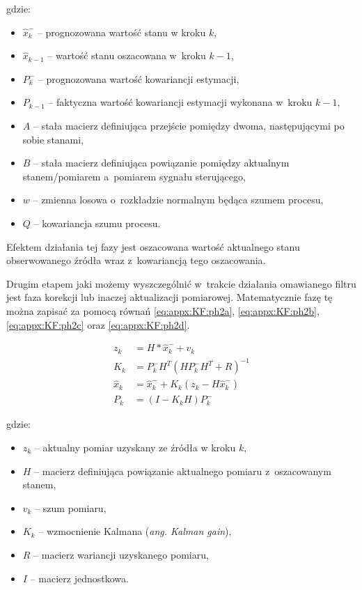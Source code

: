 gdzie:
\begin{itemize}
	\item $\widehat{x}^-_k$ -- prognozowana wartość stanu w kroku $k$,
	\item $\widehat{x}_{k-1}$ -- wartość stanu oszacowana w~kroku $k-1$,
	\item $P^-_k$ -- prognozowana wartość kowariancji estymacji,
	\item $P_{k-1}$ -- faktyczna wartość kowariancji estymacji wykonana w~kroku $k-1$,
	\item $A$ -- stała macierz definiująca przejście pomiędzy dwoma, następującymi po sobie stanami,
	\item $B$ --  stała macierz definiująca powiązanie pomiędzy aktualnym stanem/pomiarem a~pomiarem sygnału sterującego,
	\item $w$ --  zmienna losowa o~rozkładzie normalnym będąca szumem procesu,
	\item $Q$ --  kowariancja szumu procesu.
\end{itemize}

Efektem działania tej fazy jest oszacowana wartość aktualnego stanu obserwowanego źródła wraz z~kowariancją tego oszacowania.

Drugim etapem jaki możemy wyszczególnić w~trakcie działania omawianego filtru jest faza korekcji lub inaczej aktualizacji pomiarowej. Matematycznie fazę tę można zapisać za pomocą równań \ref{eq:appx:KF:ph2a}, \ref{eq:appx:KF:ph2b}, \ref{eq:appx:KF:ph2c} oraz \ref{eq:appx:KF:ph2d}.

\begin{subequations}
	\begin{align}
		z_k           & = H*\widehat{x}^-_k + v_k \label{eq:appx:KF:ph2a}                        \\
		K_k           & = P^-_{k}H^T(HP^-_{k}H^T + R)^{-1} \label{eq:appx:KF:ph2b}               \\
		\widehat{x}_k & = \widehat{x}^-_k + K_{k}(z_k-H\widehat{x}^-_k)  \label{eq:appx:KF:ph2c} \\
		P_k           & = (I-K_{k}H)P^-_k \label{eq:appx:KF:ph2d}                                
	\end{align}
\end{subequations}

gdzie:
\begin{itemize}
	\item $z_k$ -- aktualny pomiar uzyskany ze źródła w kroku $k$,
	\item $H$ -- macierz definiująca powiązanie aktualnego pomiaru z~oszacowanym stanem,
	\item $v_k$ -- szum pomiaru,
	\item $K_k$ -- wzmocnienie Kalmana (\emph{ang. Kalman gain}),
	\item $R$ -- macierz wariancji uzyskanego pomiaru,
	\item $I$ -- macierz jednostkowa.
\end{itemize}

